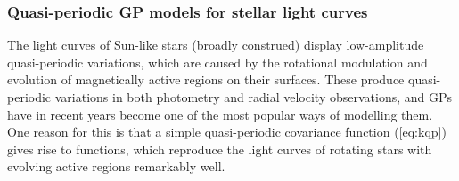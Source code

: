 \documentclass[letterpaper]{ar-1col}
\newcommand{\suz}[1]{\textcolor{magenta}{#1}}
\begin{document}
\subsubsection{Quasi-periodic GP models for stellar light curves}

The light curves of Sun-like stars (broadly construed) display low-amplitude quasi-periodic variations, which are caused by the rotational modulation and evolution of magnetically active regions on their surfaces. These produce quasi-periodic variations in both photometry and radial velocity observations, and GPs have in recent years become one of the most popular ways of modelling them. One reason for this is that a simple quasi-periodic covariance function (\autoref{eq:kqp}) gives rise to functions, which reproduce the light curves of rotating stars with evolving active regions remarkably well.

\end{document}
